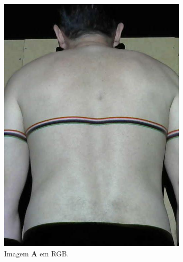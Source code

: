 \documentclass[a4paper, 12pt]{article}
\begin{document}
\begin{figure}[!h]
     \centering
     \begin{subfigure}[b]{0.4\textwidth}
         \centering
         \includegraphics[width=\textwidth]{11_obj_color.jpg}
         \caption{Imagem $\mathbf{A}$ em RGB.}
         \label{fig:cordetect:rgb}
     \end{subfigure}
     \hfill
     \begin{subfigure}[b]{0.4\textwidth}
         \centering

\end{subfigure}
\end{figure}
\end{document}
